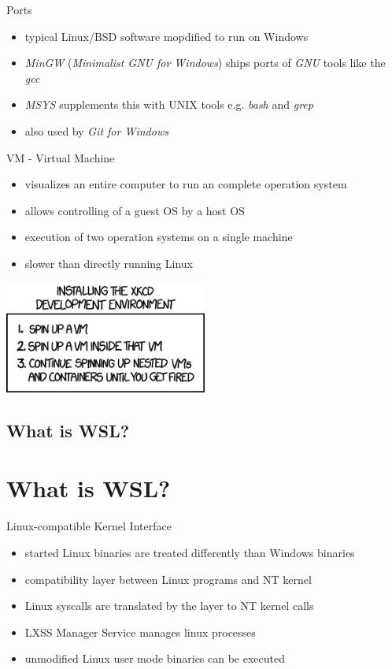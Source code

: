 \documentclass[10pt,graphics,aspectratio=169,table]{beamer}
\begin{document}
\begin{frame}{Ports}
\begin{itemize}
    \item typical Linux/BSD software mopdified to run on Windows
    \item \textit{MinGW} (\textit{Minimalist GNU for Windows}) ships ports of \textit{GNU} tools like the \textit{gcc}
    \item \textit{MSYS} supplements this with UNIX tools e.g. \textit{bash} and \textit{grep}
    \item also used by \textit{Git for Windows}
\end{itemize}
\end{frame}

\begin{frame}{VM - Virtual Machine}
\begin{itemize}
    \item visualizes an entire computer to run an complete operation system
    \item allows controlling of a guest OS by a host OS
    \item execution of two operation systems on a single machine
    \item slower than directly running Linux
\end{itemize}
\centering
\includegraphics[width=0.5\textwidth]{img/xkcde.png} \cite{xkcde}
\end{frame}

\subsection{What is WSL?}
\section*{What is WSL?}
\begin{frame}{Linux-compatible Kernel Interface}
\begin{itemize}
    \item started Linux binaries are treated differently than Windows binaries
    \item compatibility layer between Linux programs and NT kernel
    \item Linux syscalls are translated by the layer to NT kernel calls
    \item LXSS Manager Service manages linux processes
    \item unmodified Linux user mode binaries can be executed
\end{itemize}
\hfill\cite{overview}
\end{frame}
\end{document}
